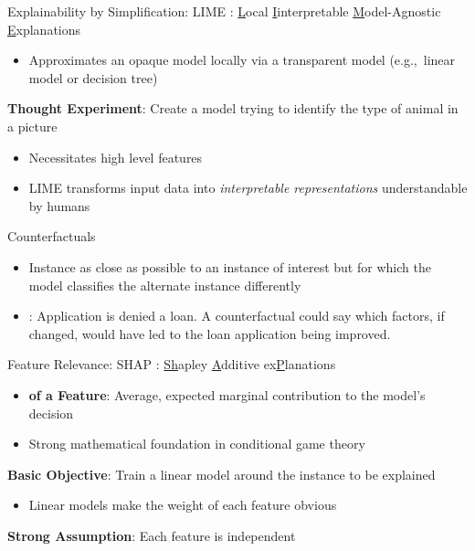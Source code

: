 \documentclass[11pt,dvipsnames,usenames,aspectratio=169]{beamer}  %
\begin{document}
\begin{frame}{Explainability by Simplification: LIME}
  \noindent
  \textbf{}: \underline{L}ocal \underline{I}interpretable \underline{M}odel-Agnostic \underline{E}xplanations~\citep{Ribeiro:2016}
  \begin{itemize}
    \item Approximates an opaque model locally via a transparent model (e.g.,~linear model or decision tree)
  \end{itemize}

  \vspace{18pt}
  \noindent
  \textbf{Thought Experiment}: Create a model trying to identify the type of animal in a picture
  \begin{itemize}
    \item Necessitates high level features
    \item LIME transforms input data into \textit{interpretable representations} understandable by humans
  \end{itemize}
\end{frame}

\begin{frame}{Counterfactuals}
  \begin{itemize}
    \setlength{\itemsep}{18pt}
    \item Instance as close as possible to an instance of interest but for which the model classifies the alternate instance differently

    \item \textit{}: Application is denied a loan.  A counterfactual could say which factors, if changed, would have led to the loan application being improved.
  \end{itemize}
\end{frame}

\begin{frame}{Feature Relevance: SHAP}
  \noindent
  \textbf{}: \underline{Sh}apley \underline{A}dditive ex\underline{P}lanations~\citep{Lundberg:2017}
  \begin{itemize}
    \item \textbf{ of a Feature}: Average, expected marginal contribution to the model's decision
    \item Strong mathematical foundation in conditional game theory
  \end{itemize}

  \vspace{18pt}
  \noindent
  \textbf{Basic Objective}: Train a linear model around the instance to be explained
  \begin{itemize}
    \item Linear models make the weight of each feature obvious
  \end{itemize}

  \vspace{18pt}
  \noindent
  \textbf{Strong Assumption}: Each feature is independent
\end{frame}
\end{document}
